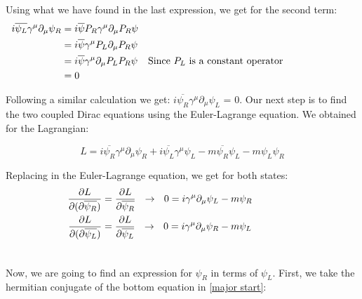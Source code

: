Using what we have found in the last expression, we get for the second term:
\begin{align}
  &\begin{aligned}
     \mathllap{i\overline{\psi_L}\gamma^\mu \partial_\mu \psi_R}  &=  i \overline{\psi}P_R \gamma^\mu \partial_\mu P_R \psi\\        
     \mathllap{}            &=  i \overline{\psi}\gamma^\mu P_L \partial_\mu P_R\psi \\
     \mathllap{}            &=  i \overline{\psi}\gamma^\mu \partial_\mu P_L P_R \psi && \text{Since $P_L$ is a constant operator}\\
     \mathllap{}            &=  0
  &\end{aligned}
\end{align}

Following a similar calculation we get: $i\overline{\psi_R}\gamma^\mu \partial_\mu \psi_L$ = 0. Our next step is to find the two coupled Dirac equations using the Euler-Lagrange equation. We 
obtained for the Lagrangian:   

\begin{equation}
L = i \overline{\psi_R} \gamma^\mu \partial_\mu \psi_R + i \overline{\psi_L}\gamma^\mu \psi_L -m\overline{\psi_R}\psi_L - m \psi_L\psi_R
\end{equation}

Replacing in the Euler-Lagrange equation, we get for both states:
\begin{align}
  &\begin{aligned}\label{major start}
     \mathllap{\frac{\partial L}{\partial(\partial \overline{\psi_R})}}  &=  \frac{\partial L}{\partial \overline{\psi_R}} \ \ \rightarrow \ \ 0 = i \gamma^\mu \partial_\mu \psi_L -m \psi_R  \\        
     \mathllap{\frac{\partial L}{\partial(\partial \overline{\psi_L})}}  &=  \frac{\partial L}{\partial \overline{\psi_L}} \ \ \rightarrow \ \ 0 = i \gamma^\mu \partial_\mu \psi_R -m \psi_L\\ 
  &\end{aligned} 
\end{align}

Now, we are going to find an expression for $\psi_R$ in terms of $\psi_L$. First, we take the hermitian conjugate of the bottom equation in \ref{major start}:

